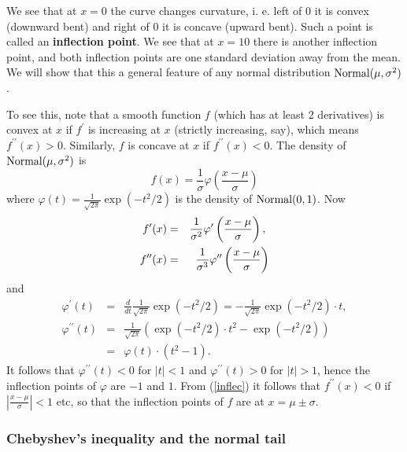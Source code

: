 We see that at $x=0$
the curve changes curvature, i. e. left of $0 $ it is convex (downward bent)
and right of $0$ it is concave (upward bent). Such a point is called an 
\textbf{inflection point}. We see that at $x=10$ there is another inflection
point, and both inflection points are one standard deviation away from the
mean. We will show that this a general feature of any normal distribution $%
\normal(\mu ,\sigma ^{2})$.

To see this, note that a smooth function $f$ (which has at least 2
derivatives) is convex at $x$ if $f^{\prime }$ is increasing at $x$
(strictly increasing, say), which means $f^{\prime \prime }(x)>0$.
Similarly, $f$ is concave at $x$ if $f^{\prime \prime }(x)<0$. The density
of $\mbox{{\rm Normal}}(\mu ,\sigma ^{2})$ is 
\begin{equation*}
f(x)=\frac{1}{\sigma }\varphi \left( \frac{x-\mu }{\sigma }\right)
\end{equation*}%
where $\varphi \left( t\right) =\frac{1}{\sqrt{2\pi }}\exp \left(
-t^{2}/2\right) $ is the density of $\mbox{{\rm Normal}}(0,1)$. Now 
\begin{eqnarray}
f^{\prime }(x) &=&\frac{1}{\sigma ^{2}}\varphi ^{\prime }\left( \frac{x-\mu 
}{\sigma }\right) \text{, }  \notag \\
f^{\prime \prime }(x) &=&\frac{1}{\sigma ^{3}}\varphi ^{\prime \prime
}\left( \frac{x-\mu }{\sigma }\right)  \label{inflec}
\end{eqnarray}%
and 
\begin{eqnarray*}
\varphi ^{\prime }\left( t\right) &=&\frac{d}{dt}\frac{1}{\sqrt{2\pi }}\exp
\left( -t^{2}/2\right) =-\frac{1}{\sqrt{2\pi }}\exp \left( -t^{2}/2\right)
\cdot t, \\
\varphi ^{\prime \prime }\left( t\right) &=&\frac{1}{\sqrt{2\pi }}\left(
\exp \left( -t^{2}/2\right) \cdot t^{2}-\exp \left( -t^{2}/2\right) \right)
\\
&=&\varphi \left( t\right) \cdot \left( t^{2}-1\right) .
\end{eqnarray*}%
It follows that $\varphi ^{\prime \prime }\left( t\right) <0$ for $|t|<1$
and $\varphi ^{\prime \prime }\left( t\right) >0$ for $|t|>1$, hence the
inflection points of $\varphi $ are $-1$ and $1$. From (\ref{inflec}) it
follows that $f^{\prime \prime }(x)<0$ if $\left\vert \frac{x-\mu }{\sigma }%
\right\vert <1$ etc, so that the inflection points of $f$ are at $x=\mu \pm
\sigma $.

\subsubsection{Chebyshev's inequality and the normal tail}

